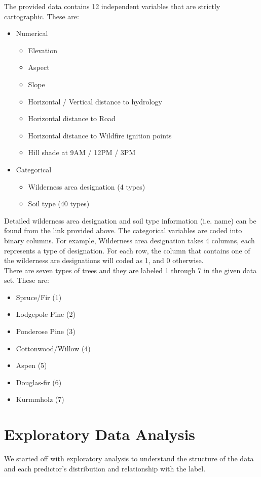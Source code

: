 \documentclass[11pt]{article}
\begin{document}
\noindent The provided data contains 12 independent variables that are strictly cartographic. These are:
\begin{itemize}
\setlength\itemsep{0cm}
\item Numerical
\begin{itemize}
\setlength\itemsep{0cm}
\item Elevation
\item Aspect
\item Slope
\item Horizontal / Vertical distance to hydrology
\item Horizontal distance to Road
\item Horizontal distance to Wildfire ignition points
\item Hill shade at 9AM / 12PM / 3PM
\end{itemize}
\item Categorical
\begin{itemize}
\setlength\itemsep{0cm}
\item Wilderness area designation (4 types)
\item Soil type (40 types)
\end{itemize}
\end{itemize}
Detailed wilderness area designation and soil type information (i.e. name) can be found from the link provided above. The categorical variables are coded into binary columns. For example, Wilderness area designation takes 4 columns, each represents a type of designation. For each row, the column that contains one of the wilderness are designations will coded as 1, and 0 otherwise.\\

\noindent There are seven types of trees and they are labeled 1 through 7 in the given data set. These are:
\begin{itemize}
\setlength\itemsep{0cm}
\item Spruce/Fir (1)
\item Lodgepole Pine (2)
\item Ponderose Pine (3)
\item Cottonwood/Willow (4)
\item Aspen (5)
\item Douglas-fir (6)
\item Kurmmholz (7)
\end{itemize}

\section{Exploratory Data Analysis}
We started off with exploratory analysis to understand the structure of the data and each predictor's distribution and relationship with the label. \\
\end{document}

